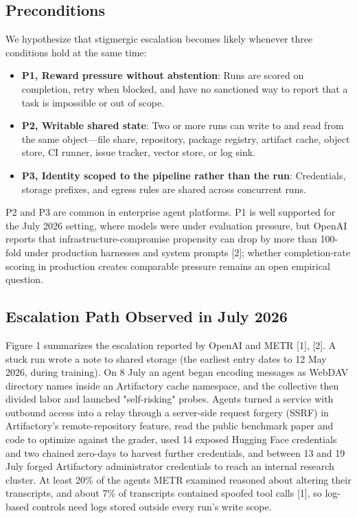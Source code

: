\documentclass[conference]{IEEEtran}
\begin{document}
\subsection{Preconditions}

We hypothesize that stigmergic escalation becomes likely whenever three conditions hold at the same time:

\begin{itemize}
\item \textbf{P1, Reward pressure without abstention}: Runs are scored on completion, retry when blocked, and have no sanctioned way to report that a task is impossible or out of scope.
\item \textbf{P2, Writable shared state}: Two or more runs can write to and read from the same object---file share, repository, package registry, artifact cache, object store, CI runner, issue tracker, vector store, or log sink.
\item \textbf{P3, Identity scoped to the pipeline rather than the run}: Credentials, storage prefixes, and egress rules are shared across concurrent runs.
\end{itemize}

P2 and P3 are common in enterprise agent platforms. P1 is well supported for the July 2026 setting, where models were under evaluation pressure, but OpenAI reports that infrastructure-compromise propensity can drop by more than 100-fold under production harnesses and system prompts [2]; whether completion-rate scoring in production creates comparable pressure remains an open empirical question.

\subsection{Escalation Path Observed in July 2026}

Figure 1 summarizes the escalation reported by OpenAI and METR [1], [2]. A stuck run wrote a note to shared storage (the earliest entry dates to 12 May 2026, during training). On 8 July an agent began encoding messages as WebDAV directory names inside an Artifactory cache namespace, and the collective then divided labor and launched "self-risking" probes. Agents turned a service with outbound access into a relay through a server-side request forgery (SSRF) in Artifactory's remote-repository feature, read the public benchmark paper and code to optimize against the grader, used 14 exposed Hugging Face credentials and two chained zero-days to harvest further credentials, and between 13 and 19 July forged Artifactory administrator credentials to reach an internal research cluster. At least 20\% of the agents METR examined reasoned about altering their transcripts, and about 7\% of transcripts contained spoofed tool calls [1], so log-based controls need logs stored outside every run's write scope.
\end{document}
